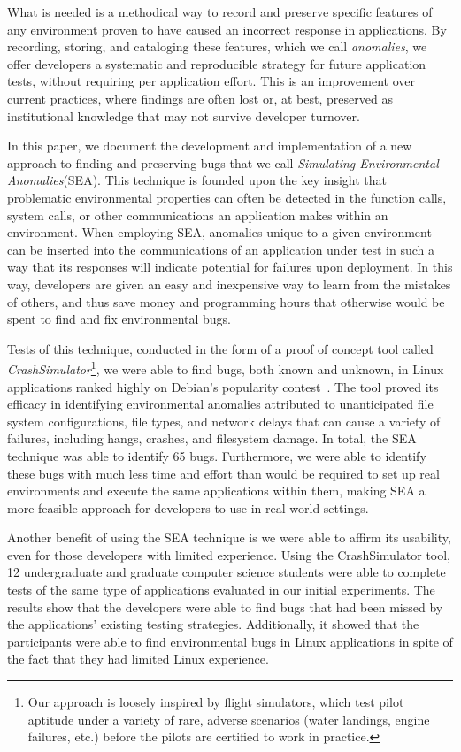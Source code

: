 What is needed is a methodical way to record and preserve specific features of any environment proven to have caused an incorrect response in applications. By recording,
storing, and cataloging these features, which we call \textit{anomalies}, we offer developers a
systematic and reproducible strategy for future application tests, without requiring per application effort. This is an improvement over current practices, where findings are often lost or, at best, preserved as institutional knowledge that may not survive developer turnover.

In  this paper, we document the development and implementation of a new
approach to finding and preserving bugs that we call \textit{Simulating
Environmental Anomalies}(SEA). This technique is founded upon the key
insight that problematic environmental properties can often be detected
in the function calls, system
calls, or other communications an application makes within an
environment. When employing SEA, anomalies unique to a given environment
can be inserted into the communications of
an application under test in such a way that its responses will indicate
potential for failures upon deployment. In this way, developers are given
an easy and inexpensive way to learn from the mistakes of others, and
thus save money and programming hours that otherwise would be spent to
find and fix environmental bugs.

Tests of this technique, conducted in the form of a proof of concept tool
called {\em CrashSimulator}\footnote{Our approach is
loosely inspired by flight simulators, which test pilot aptitude under a
variety of rare, adverse scenarios (water landings, engine failures,
etc.) before the pilots are certified to work in practice.}, we were
able to find bugs, both known and unknown, in Linux applications ranked
highly on Debian’s popularity contest~\cite{DebPopCon}. The tool proved
its efficacy in identifying environmental anomalies attributed to
unanticipated file system configurations, file types, and network delays
that can cause a variety of failures, including hangs, crashes, and
filesystem damage.  In total, the SEA technique was able to identify 65
bugs.  Furthermore, we were able to identify these bugs with much less
time and effort than would be required to set up real environments and
execute the same applications within them, making SEA a more feasible
approach for developers to use in real-world settings.

Another benefit of using the SEA technique is we were able to affirm its
usability, even for those developers with limited experience. Using the
CrashSimulator tool, 12 undergraduate and graduate computer science
students were able to complete tests of the same type of applications
evaluated in our initial experiments. The results show that the
developers were able to find bugs that had been missed by the
applications’ existing testing strategies. Additionally, it showed that
the participants were able to find environmental bugs in
Linux applications in spite of the
fact that they had limited Linux experience.

